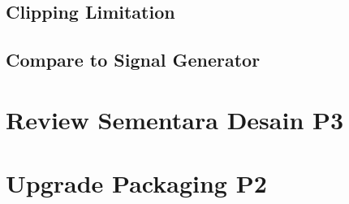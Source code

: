 \documentclass[table,dvipsnames]{beamer}
\begin{document}
	\subsection{Clipping Limitation}
	
	\subsection{Compare to Signal Generator}
	
	\section {Review Sementara Desain P3}
	
	\section{Upgrade Packaging P2}
\end{document}
